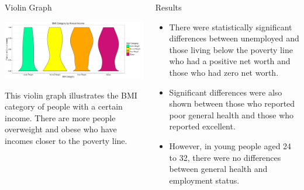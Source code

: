 \documentclass[final]{beamer}\usepackage[]{graphicx}\usepackage[]{color}
\makeatletter
\def\maxwidth{ %
  \ifdim\Gin@nat@width>\linewidth
    \linewidth
  \else
    \Gin@nat@width
  \fi
}
\newenvironment{knitrout}{}{} %
\makeatother
\begin{document}
\begin{frame}[fragile]
\begin{columns}[t]
\begin{column}{0.31\linewidth}
\begin{minipage}[t][.955\textheight]{\linewidth}
\begin{block}{Violin Graph}
\begin{knitrout}
{\centering \includegraphics[width=\maxwidth]{figure/ViolinGraphs-1} 

}



\end{knitrout}

This violin graph illustrates the BMI category of people with a certain income. There are more people overweight and obese who have incomes closer to the poverty line.

\vspace{-1ex}
\end{block}
\vfill

\end{minipage}
\end{column}%

\begin{column}{0.31\linewidth}
\begin{minipage}[t][.955\textheight]{\linewidth} 
\vspace{0ex}
\begin{block}{Results}
\vspace{0ex}
\begin{itemize}
\item There were statistically significant differences between unemployed and those living below the poverty line who had a positive net worth and those who had zero net worth. 
\item Significant differences were also shown between those who reported poor general health and those who reported excellent.
\item However, in young people aged 24 to 32, there were no differences between general health
and employment status. 
\end{itemize}
\vspace{1ex}
\vfill
\end{block}
\vfill


\end{minipage}
\end{column}
\end{columns}
\end{frame}
\end{document}
